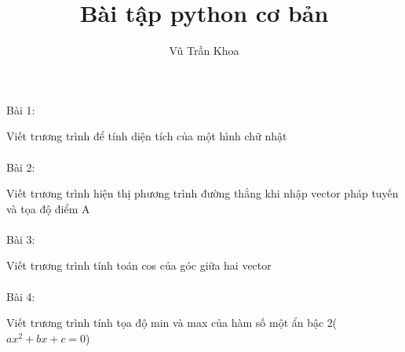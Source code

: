 \usepackage[vietnamese]{babel}

\title{Bài tập python cơ bản}
\author{Vũ Trần Khoa}

Bài 1:

Viết trương trình để tính diện tích của một hình chữ nhật\\
\\
Bài 2:

Viết trương trình hiện thị phương trình đường thẳng khi nhập vector pháp tuyến và tọa độ điểm A\\
\\
Bài 3:

Viết trương trình tính toán cos của góc giữa hai vector\\
\\
Bài 4:

Viết trương trình tính tọa độ min và max của hàm số một ẩn bậc 2($ax^2 + bx + c = 0$)\\
\\



